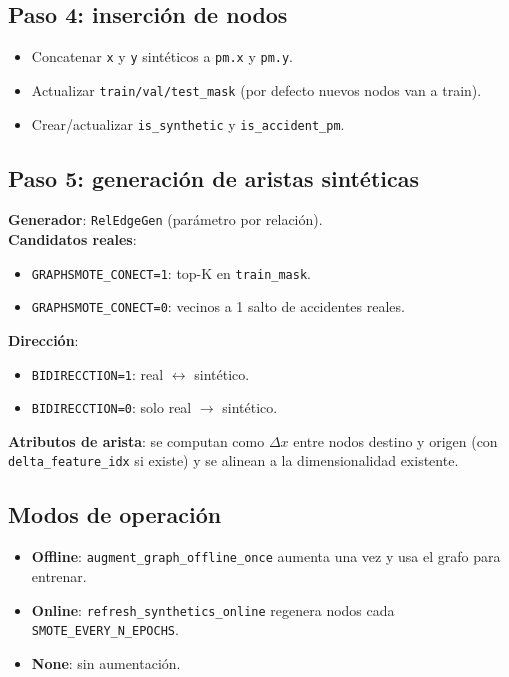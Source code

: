 \subsection{Paso 4: inserci\'on de nodos}
\begin{itemize}[leftmargin=*]
  \item Concatenar \texttt{x} y \texttt{y} sint\'eticos a \texttt{pm.x} y \texttt{pm.y}.
  \item Actualizar \texttt{train/val/test\_mask} (por defecto nuevos nodos van a train).
  \item Crear/actualizar \texttt{is\_synthetic} y \texttt{is\_accident\_pm}.
\end{itemize}

\subsection{Paso 5: generaci\'on de aristas sint\'eticas}
\textbf{Generador}: \texttt{RelEdgeGen} (par\'ametro por relaci\'on).\\
\textbf{Candidatos reales}:
\begin{itemize}[leftmargin=*]
  \item \texttt{GRAPHSMOTE\_CONECT=1}: top-K en \texttt{train\_mask}.
  \item \texttt{GRAPHSMOTE\_CONECT=0}: vecinos a 1 salto de accidentes reales.
\end{itemize}
\textbf{Direcci\'on}:
\begin{itemize}[leftmargin=*]
  \item \texttt{BIDIRECCTION=1}: real $\leftrightarrow$ sint\'etico.
  \item \texttt{BIDIRECCTION=0}: solo real $\to$ sint\'etico.
\end{itemize}
\textbf{Atributos de arista}: se computan como $\Delta x$ entre nodos destino y origen (con \texttt{delta\_feature\_idx} si existe) y se alinean a la dimensionalidad existente.

\subsection{Modos de operaci\'on}
\begin{itemize}[leftmargin=*]
  \item \textbf{Offline}: \texttt{augment\_graph\_offline\_once} aumenta una vez y usa el grafo para entrenar.
  \item \textbf{Online}: \texttt{refresh\_synthetics\_online} regenera nodos cada \texttt{SMOTE\_EVERY\_N\_EPOCHS}.
  \item \textbf{None}: sin aumentaci\'on.
\end{itemize}

